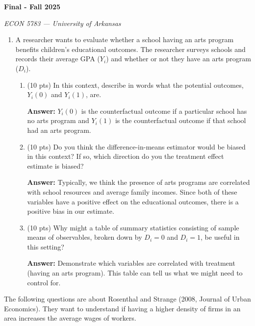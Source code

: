 \documentclass[12pt]{article}
\newcommand{\answer}[1]{{\color{blue_winged_teal}\textbf{Answer:} #1}}
\newcommand{\pts}[1]{{\color{zinc500}(#1 pts)}}
\begin{document}
\begin{center}
  {\Huge\bf Final - Fall 2025}

  \smallskip
  {\large\it ECON 5783 — University of Arkansas}
\end{center}
\medskip

\begin{enumerate}
  \item A researcher wants to evaluate whether a school having an arts program benefits children's educational outcomes. 
  The researcher surveys schools and records their average GPA ($Y_i$) and whether or not they have an arts program ($D_i$).
  \begin{enumerate}
    \item \pts{10} In this context, describe in words what the potential outcomes, $Y_i(0)$ and $Y_i(1)$, are.
    
    \answer{
      $Y_i(0)$ is the counterfactual outcome if a particular school has no arts program and $Y_i(1)$ is the counterfactual outcome if that school had an arts program.
    }
    
    \medskip
    \item \pts{10} Do you think the difference-in-means estimator would be biased in this context? 
    If so, which direction do you the treatment effect estimate is biased?

    \answer{Typically, we think the presence of arts programs are correlated with school resources and average family incomes. Since both of these variables have a positive effect on the educational outcomes, there is a positive bias in our estimate.}
    
    \medskip
    \item \pts{10} Why might a table of summary statistics consisting of sample means of observables, broken down by $D_i = 0$ and $D_i = 1$, be useful in this setting?
    
    \answer{
      Demonstrate which variables are correlated with treatment (having an arts program). 
      This table can tell us what we might need to control for.  
    }
  \end{enumerate}
\end{enumerate}

\bigskip\bigskip
\noindent The following questions are about Rosenthal and Strange (2008, Journal of Urban Economics). 
They want to understand if having a higher density of firms in an area increases the average wages of workers. 
\end{document}
